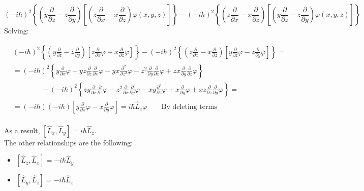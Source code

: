 	$$(-i \hbar)^{2}\left\{\left(y \frac{\partial}{\partial z}-z \frac{\partial}{\partial y}\right)\left[\left(z \frac{\partial}{\partial x}-x \frac{\partial}{\partial z}\right) \varphi(x, y, z)\right]\right\}-(-i h)^{2}\left\{\left(z \frac{\partial}{\partial x}-x \frac{\partial}{\partial z}\right)\left[\left(y \frac{\partial}{\partial z}-z \frac{\partial}{\partial y}\right) \varphi(x, y, z)\right]\right\}
	$$
	Solving:

	\begin{align*}
		&(-i \hbar)^{2}\left\{\left(y \frac{\partial}{\partial z}-z \frac{\partial}{\partial y}\right)\left[z \frac{\partial}{\partial x} \varphi-x \frac{\partial}{\partial z} \varphi\right]\right\}-(-i h)^{2}\left\{\left(z \frac{\partial}{\partial x}-x \frac{\partial}{\partial z}\right)\left[y \frac{\partial}{\partial z} \varphi-z \frac{\partial}{\partial y} \varphi\right]\right\}=\\
		&=(-i \hbar)^{2}\left\{{y \frac{\partial}{\partial x} \varphi+y z \frac{\partial}{\partial z} \frac{\partial}{\partial x} \varphi-y x \frac{\partial^{2}}{\partial z^{2}} \varphi-z^{2} \frac{\partial}{\partial y} \frac{\partial}{\partial x} \varphi+z x \frac{\partial}{\partial y} \frac{\partial}{\partial z} \varphi}\right\} \\
		&\qquad\qquad-(-i\hbar)^{2}\left\{{z y \frac{\partial}{\partial x} \frac{\partial}{\partial z} \varphi-z^{2} \frac{\partial}{\partial x} \frac{\partial}{\partial y} \varphi-x y \frac{\partial^{2}}{\partial z} \varphi+x \frac{\partial}{\partial y} \varphi+x z \frac{\partial}{\partial z} \frac{\partial}{\partial y} \varphi}\right\}=\\
		&=(-i \hbar)(-i \hbar)[y \frac{\partial}{\partial x} \varphi-x\frac{\partial}{\partial y}\varphi] = i\hbar \hat{L}_{z}\varphi \qquad \text {By deleting terms}\\
\end{align*}

	As a result, $\left[\hat{L}_{x}, \hat{L}_{y}\right]=i\hbar \hat{L}_{z}$.\\

	\noindent
	The other relationships are the following:

	\begin{multicols}{2}
		\begin{itemize}
			\item $\left[\hat{L}_{z}, \hat{L}_{x}\right]=-i \hbar \hat{L}_{y}$
			\item $\left[\hat{L}_{y}, \hat{L}_{z}\right]=-i \hbar \hat{L}_{x}$
		\end{itemize}
	\end{multicols}

